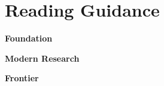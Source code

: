 \section{Reading Guidance}

\begin{readingbox}
\textbf{Foundation}

\textbf{Modern Research}

\textbf{Frontier}

\end{readingbox}


